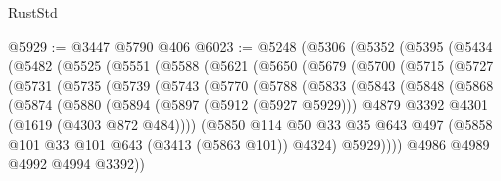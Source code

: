 \begin{lexlean}{RustStd}
\begin{coremodule}
@5929 := @3447 @5790 @406
@6023 := @5248
    (@5306
      (@5352
        (@5395
          (@5434
            (@5482
              (@5525
                (@5551
                  (@5588
                    (@5621
                      (@5650
                        (@5679
                          (@5700
                            (@5715
                              (@5727
                                (@5731
                                  (@5735
                                    (@5739
                                      (@5743
                                        (@5770
                                          (@5788
                                            (@5833
                                              (@5843
                                                (@5848
                                                  (@5868
                                                    (@5874
                                                      (@5880
                                                        (@5894
                                                          (@5897 (@5912 (@5927 @5929)))
                                                          @4879
                                                          @3392
                                                          @4301
                                                          (@1619 (@4303 @872 @484))))
                                                      (@5850
                                                        @114
                                                        @50
                                                        @33
                                                        @35
                                                        @643
                                                        @497
                                                        (@5858
                                                          @101
                                                          @33
                                                          @101
                                                          @643
                                                          (@3413 (@5863 @101))
                                                          @4324)
                                                        @5929))))
                                                @4986
                                                @4989
                                                @4992
                                                @4994
                                                @3392))

\end{coremodule}
\end{lexlean}
